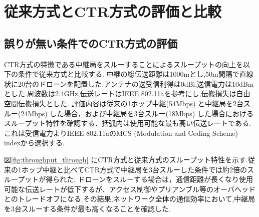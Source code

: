 \documentclass[a4paper,10.5pt]{ltjsarticle}
\begin{document}
\clearpage
\section{従来方式とCTR方式の評価と比較}
\subsection{誤りが無い条件でのCTR方式の評価}
CTR方式の特徴である中継局をスルーすることによるスループットの向上を以下の条件で従来方式と比較する.
中継の総伝送距離は1000mとし,50m間隔で直線状に20台のドローンを配置した.アンテナの送受信利得は0dBi,送信電力は10dBmとした.周波数は2.4GHz,伝送レートはIEEE 802.11aを参考にし,伝搬損失は自由空間伝搬損失とした.%
評価内容は従来の1ホップ中継(54Mbps) と中継局を2台スルー(24Mbps) した場合，および中継局を3台スルー(18Mbps) した場合におけるスループット特性を確認する．括弧内は使用可能な最も高い伝送レートである.これは受信電力よりIEEE 802.11aのMCS (Modulation and Coding Scheme) indexから選択する.

図\ref{fig:throughput_through} にCTR方式と従来方式のスループット特性を示す.従来の1ホップ中継と比べてCTR方式で中継局を3台スルーした条件では約2倍のスループットが得られた.
ドローンをスルーする場合は，通信距離が長くなり使用可能な伝送レートが低下するが、アクセス制御やプリアンブル等のオーバヘッドとのトレードオフになる.その結果,ネットワーク全体の通信効率において,中継局を3台スルーする条件が最も高くなることを確認した.
\end{document}
